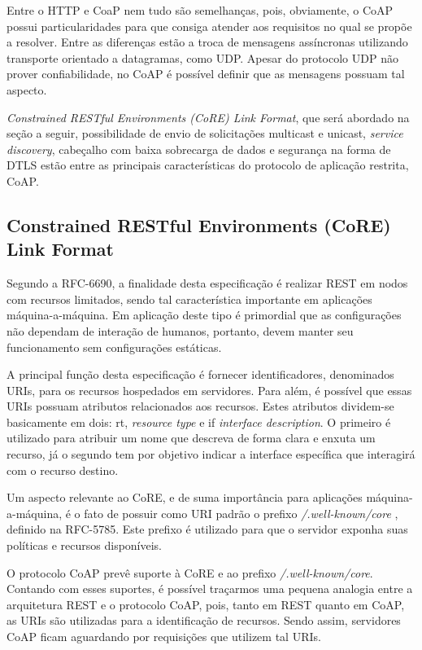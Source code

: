 Entre o HTTP e CoaP nem tudo são semelhanças, pois, obviamente, o CoAP possui particularidades para que consiga atender aos requisitos no qual se propõe a resolver.
Entre as diferenças estão a troca de mensagens assíncronas utilizando transporte orientado a datagramas, como UDP.
Apesar do protocolo UDP não prover confiabilidade, no CoAP é possível definir que as mensagens possuam tal aspecto.

\textit{Constrained RESTful Environments (CoRE) Link Format}, que será abordado na seção a seguir, possibilidade de envio de solicitações multicast e unicast, \textit{service discovery}, cabeçalho com baixa sobrecarga de dados e segurança na forma de DTLS\cite{rfc6347}
estão entre as principais características do protocolo de aplicação restrita, CoAP.

\subsection{Constrained RESTful Environments (CoRE) Link Format}

Segundo a RFC-6690, a finalidade desta especificação é realizar REST em nodos com recursos limitados, sendo tal característica importante em aplicações máquina-a-máquina\cite{rfc6690}.
Em aplicação deste tipo é primordial que as configurações não dependam de interação de humanos, portanto, devem manter seu funcionamento sem configurações estáticas.


A principal função desta especificação é fornecer identificadores, denominados URIs, para os recursos hospedados em servidores. 
Para além, é possível que essas URIs possuam atributos relacionados aos recursos.
Estes atributos dividem-se basicamente em dois: rt, \textit{resource type} e if \textit{interface description}.
O primeiro é utilizado para atribuir um nome que descreva de forma clara e enxuta um recurso,
já o segundo tem por objetivo indicar a interface específica que interagirá com o recurso destino.

Um aspecto relevante ao CoRE, e de suma importância para aplicações máquina-a-máquina, é o fato de possuir como URI padrão o prefixo \textit{/.well-known/core} , definido na RFC-5785\cite{rfc5785}.
Este prefixo é utilizado para que o servidor exponha suas políticas e recursos disponíveis.

O protocolo CoAP prevê suporte à CoRE e ao prefixo \textit{/.well-known/core}.
Contando com esses suportes, é possível traçarmos uma pequena analogia entre a arquitetura REST e o protocolo CoAP, pois, tanto em REST quanto em CoAP, as URIs são utilizadas para a identificação de recursos.
Sendo assim, servidores CoAP ficam aguardando por requisições que utilizem tal URIs.

